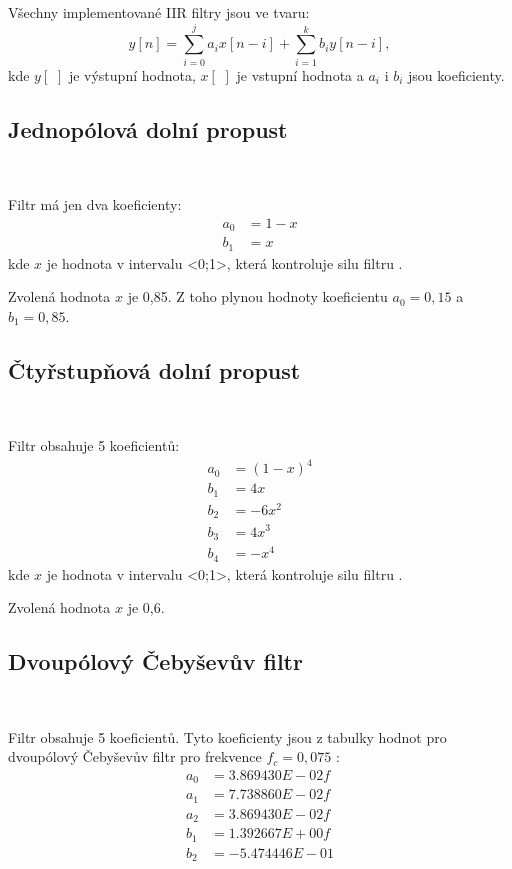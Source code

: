 Všechny implementované IIR filtry jsou ve tvaru:
\begin{equation}
y[n] = \sum_{i = 0}^{j}a_{i}x[n - i] + \sum_{i = 1}^{k}b_{i}y[n - i],
\end{equation}
kde $y[\,\,]$ je výstupní hodnota, $x[\,\,]$ je vstupní hodnota a $a_i$ i $b_i$ jsou
koeficienty.

\subsection{Jednopólová dolní propust}\

Filtr má jen dva koeficienty:
\begin{align}
a_0 &= 1 - x \\
b_1 &= x
\end{align}
kde $x$ je hodnota v intervalu <0;1>, která kontroluje silu filtru \cite{Filters}.

Zvolená hodnota $x$ je 0,85. Z toho plynou hodnoty koeficientu $a_0 = 0,15$ a $b_1 =
0,85$.

\subsection{Čtyřstupňová dolní propust}\

Filtr obsahuje 5 koeficientů:
\begin{align}
a_0 &= (1 - x)^4 \\
b_1 &= 4x \\
b_2 &= -6x^2 \\
b_3 &= 4x^3 \\
b_4 &= -x^4
\end{align}
kde $x$ je hodnota v intervalu <0;1>, která kontroluje silu filtru \cite{Filters}.

Zvolená hodnota $x$ je 0,6.

\subsection{Dvoupólový Čebyševův filtr}\

Filtr obsahuje 5 koeficientů. Tyto koeficienty jsou z tabulky hodnot pro dvoupólový
Čebyševův filtr pro frekvence $f_c = 0,075$ \cite{Filters}:
\begin{align}
a_0 &= 3.869430E-02f \\
a_1 &= 7.738860E-02f \\
a_2 &= 3.869430E-02f \\
b_1 &= 1.392667E+00f \\
b_2 &= -5.474446E-01 \\
\end{align}

